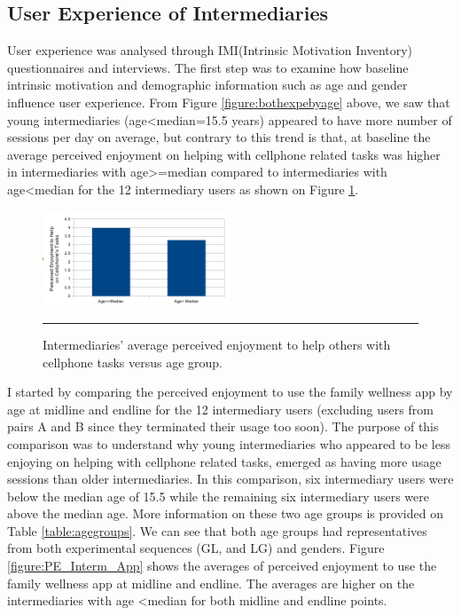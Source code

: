\subsection{User Experience of Intermediaries}
User experience was analysed through IMI(Intrinsic Motivation Inventory) questionnaires and interviews. The first step was to examine how baseline intrinsic motivation and  demographic information such as age and gender influence user experience. From Figure \ref{figure:bothexpebyage} above, we saw that young intermediaries (age\textless median=15.5 years) appeared to have more number of sessions per day on average, but contrary to this trend is that, at baseline the average perceived enjoyment on helping with cellphone related tasks was higher in intermediaries with age\textgreater=median compared to intermediaries with age\textless median for the 12 intermediary users as shown on Figure \ref{figure:PE_HELP_Age}. 
\begin{figure}[htbp]
  \centering
    \includegraphics[width=0.5\textwidth]{Figures/PE_HELP_Age.png}
    \rule{35em}{0.5pt}
  \caption{Intermediaries' average perceived enjoyment to help others with cellphone tasks versus age group.}
  \label{figure:PE_HELP_Age}
\end{figure}\newline
I started by comparing the perceived enjoyment to use the family wellness app by age at midline and endline for the 12 intermediary users (excluding users from pairs A and B since they terminated their usage too soon). The purpose of this comparison was to understand why young intermediaries who appeared to be less enjoying on helping with cellphone related tasks, emerged as having more usage sessions than older intermediaries. In this comparison, six intermediary users were below the median age of 15.5 while the remaining six intermediary users were above the median age. More information on these two age groups is provided on Table \ref{table:agegroups}. We can see that both age groups had representatives from both experimental sequences (GL, and LG)  and genders. Figure \ref{figure:PE_Interm_App} shows the averages of perceived enjoyment to use the family wellness app at midline and endline. The averages are higher on the intermediaries with age \textless median for both midline and endline points. \newline
